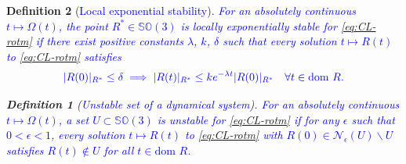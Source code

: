 \documentclass{article}
\newcommand{\dom}{\text{dom }}
\newcommand{\SOthree}{\mathbb{SO}(3)}
\newtheorem{definition}{Definition}
\newcommand{\textblue}[1]{\textcolor{blue}{#1}}
\newcommand{\Rtilde}{\tilde{R}}
\newcommand{\normSOthree}[1]{{{\vert}#1 {\vert}_I}}
\newcommand{\expo}[1]{e^{#1}}
\newcommand{\Rstar}{{R^*}}
\newcommand{\neighbourhood}[2]{\mathcal{N}_{#1}(#2)}
\begin{document}
\begin{definition}[\textblue{Local exponential stability}]\label{def:local_lyap_stab}
\textblue{For an absolutely continuous $t\mapsto\Omega(t)$, the point $\Rstar\in\SOthree$ is locally exponentially stable {for \eqref{eq:CL-rotm}} if there exist positive constants $\lambda$, $k$, $\delta$ such that every solution $t\mapsto R(t)$ {to \eqref{eq:CL-rotm}} satisfies}
\begin{align*}
    \textblue{|R(0)|_{\Rstar}\leq \delta \implies |R(t)|_{\Rstar} \leq  k\expo{-\lambda t} |R(0)|_{\Rstar} \quad \forall t \in \dom R.}
\end{align*}

    

\begin{definition}[\textblue{Unstable set of a dynamical system}] \textblue{For an absolutely continuous $t\mapsto \Omega(t)$, a set $U\subset \SOthree$ is unstable for \eqref{eq:CL-rotm} if for any $\epsilon$ such that $0 < \epsilon < 1$, every solution $t\mapsto R(t)$ to \eqref{eq:CL-rotm} with $R(0) \in \neighbourhood{\epsilon}{U}\backslash U$ satisfies $R(t)\notin U$ for all $t\in \dom R$.  }
    
\end{definition}




\end{definition}

\end{document}
